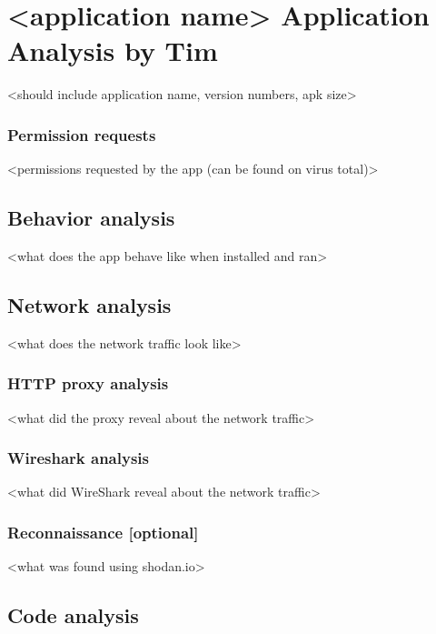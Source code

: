\section{<application name> Application Analysis by Tim}

<should include application name, version numbers, apk size>



\subsubsection{Permission requests}

<permissions requested by the app (can be found on virus total)>

\newpage
\subsection{Behavior analysis}

<what does the app behave like when installed and ran>

\newpage
\subsection{Network analysis}

<what does the network traffic look like>

\subsubsection{HTTP proxy analysis}

<what did the proxy reveal about the network traffic>

\subsubsection{Wireshark analysis}

<what did WireShark reveal about the network traffic>

\subsubsection{Reconnaissance [optional]}

<what was found using shodan.io>

\newpage
\subsection{Code analysis}

